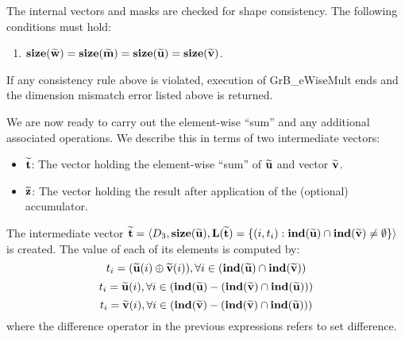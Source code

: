 The internal vectors and masks are checked for shape consistency. The following 
conditions must hold:
\begin{enumerate}
	\item $\bold{size}({\bf \widetilde{w}}) = \bold{size}({\bf \widetilde{m}})
    = \bold{size}({\bf \widetilde{u}}) = \bold{size}({\bf \widetilde{v}})$.
\end{enumerate}
If any consistency rule above is violated, execution of {\sf GrB\_eWiseMult} ends and 
the dimension mismatch error listed above is returned.

We are now ready to carry out the element-wise ``sum'' and any additional 
associated operations.  We describe this in terms of two intermediate vectors:
\begin{itemize}
	\item ${\bf \widetilde{t}}$: The vector holding the element-wise ``sum'' of
    ${\bf \widetilde{u}}$ and vector ${\bf \widetilde{v}}$.
	\item ${\bf \widetilde{z}}$: The vector holding the result after 
    application of the (optional) accumulator.
\end{itemize}

The intermediate vector ${\bf \widetilde{t}} = \langle
D_3, \bold{size}({\bf \widetilde{u}}),
\bold{L}({\bf \widetilde{t}}) =
\{(i,t_i) : \bold{ind}({\bf \widetilde{u}}) \cap 
\bold{ind}({\bf \widetilde{v}})
 \neq \emptyset \} \rangle$
is created.  The value of each of its elements is computed by:
\[t_i = ({\bf \widetilde{u}}(i) \oplus {\bf \widetilde{v}}(i)), \forall i \in (\bold{ind}({\bf \widetilde{u}}) \cap \bold{ind}({\bf \widetilde{v}}))\]
\[t_i = {\bf \widetilde{u}}(i), \forall i \in (\bold{ind}({\bf \widetilde{u}}) - (\bold{ind}({\bf \widetilde{v}}) \cap \bold{ind}({\bf \widetilde{u}})))\]
\[t_i = {\bf \widetilde{v}}(i), \forall i \in (\bold{ind}({\bf \widetilde{v}}) - (\bold{ind}({\bf \widetilde{v}}) \cap \bold{ind}({\bf \widetilde{u}})))\]
where the difference operator in the previous expressions refers to set difference.

